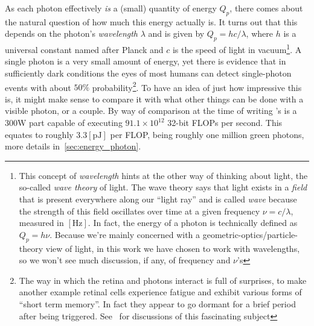 As each photon effectively \emph{is} a (small) quantity of energy $Q_p$, there comes about 
the natural question of how much this energy actually is. 
It turns out that this depends on the photon's \textsl{\gls{wavelength}} $\lambda$ and is given by
$Q_p = hc/\lambda$, where $h$ is a universal constant named after Planck 
and $c$ is the speed of light in vacuum\footnote{This concept of \textsl{wavelength} hints 
	at the other way of thinking about light, the so-called \textsl{wave theory} of light. 
	The wave theory says that light exists in a \textsl{field} that is 
	present everywhere along our ``light ray'' and is called \textsl{wave} because the strength 
	of this field oscillates over time at a given frequency $\nu = c/\lambda$, 
	measured in $[\unit\hertz]$. 
	In fact, the energy of a photon is technically defined as $Q_p = h\nu$. 
	Because we're mainly concerned with a geometric-optics/particle-theory view of light, 
	in this work we have chosen to work with wavelengths, so we won't
	see much discussion, if any, of frequency and $\nu$'s}. 
A single photon is a very small amount of energy, yet there is evidence that in sufficiently 
dark conditions the eyes of most humans can detect single-photon events with about $50\%$ 
probability\footnote{
	The way in which the retina and photons interact is full of surprises, to make another
	example retinal cells experience fatigue and exhibit various forms of ``short term memory''.
	In fact they appear to go dormant for a brief period after being triggered.
	See~\cite{fairchild2013,wyszecki82} for discussions of this fascinating subject
}. 
To have an idea of just how impressive this is, it might make sense to compare it
with what other things can be done with a visible photon, or a couple. 
By way of comparison at the time of writing 's  
 is a $300 \unit{\watt}$ part capable of executing $91.1 \times 10^{12}$ 32-bit \glspl{FLOP} 
per second.
This equates to roughly $3.3 [\unit{\pico\joule}]$ per \gls{FLOP}, being roughly one million green
photons, more details in~\cref{sec:energy_photon}.

